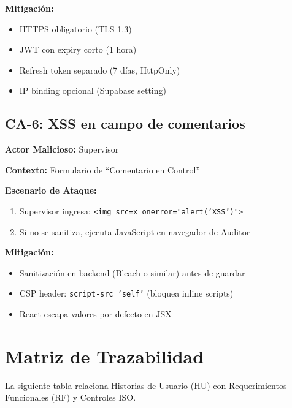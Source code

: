 \documentclass[12pt,a4paper,oneside]{article}
\begin{document}
\textbf{Mitigación:}
\begin{itemize}
  \item [OK] HTTPS obligatorio (TLS 1.3)
  \item [OK] JWT con expiry corto (1 hora)
  \item [OK] Refresh token separado (7 días, HttpOnly)
  \item [OK] IP binding opcional (Supabase setting)
\end{itemize}

\subsection{CA-6: XSS en campo de comentarios}

\textbf{Actor Malicioso:} Supervisor

\textbf{Contexto:} Formulario de ``Comentario en Control''

\textbf{Escenario de Ataque:}
\begin{enumerate}
  \item Supervisor ingresa: \texttt{\textless{}img src=x onerror="alert('XSS')"\textgreater{}}
  \item Si no se sanitiza, ejecuta JavaScript en navegador de Auditor
\end{enumerate}

\textbf{Mitigación:}
\begin{itemize}
  \item [OK] Sanitización en backend (Bleach o similar) antes de guardar
  \item [OK] CSP header: \texttt{script-src 'self'} (bloquea inline scripts)
  \item [OK] React escapa valores por defecto en JSX
\end{itemize}

\section{Matriz de Trazabilidad}

La siguiente tabla relaciona Historias de Usuario (HU) con Requerimientos Funcionales (RF) y Controles ISO.
\end{document}
